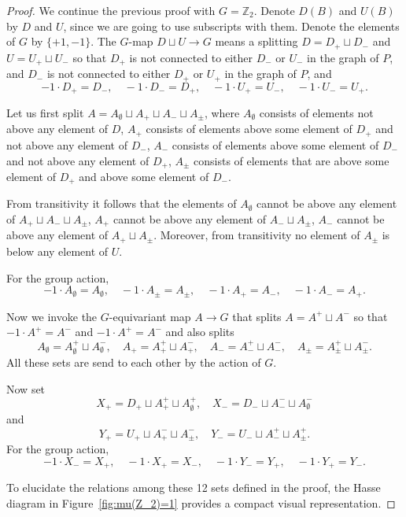\documentclass[10pt,a4paper]{amsart}
\begin{document}
\begin{proof}
We continue the previous proof with $G=\mathbb Z_2$. Denote $D(B)$ and $U(B)$ by $D$ and $U$, since we are going to use subscripts with them. Denote the elements of $G$ by $\{+1, -1\}$. The $G$-map $D\sqcup U\to G$ means a splitting $D=D_+\sqcup D_-$ and $U=U_+\sqcup U_-$ so that $D_+$ is not connected to either $D_-$ or $U_-$ in the graph of $P$, and $D_-$ is not connected to either $D_+$ or $U_+$ in the graph of $P$, and
    \[
    -1\cdot D_+=D_-, \quad -1\cdot D_-=D_+, \quad -1\cdot U_+=U_-, \quad -1\cdot U_-=U_+.
    \]
    
    Let us first split $A=A_\emptyset\sqcup A_+\sqcup A_-\sqcup A_\pm$, where $A_\emptyset$ consists of elements not above any element of $D$, $A_+$ consists of elements above some element of $D_+$ and not above any element of $D_-$, $A_-$ consists of elements above some element of $D_-$ and not above any element of $D_+$, $A_\pm$ consists of elements that are above some element of $D_+$ and above some element of $D_-$. 
    
    From transitivity it follows that the elements of $A_\emptyset$ cannot be above any element of $A_+\sqcup A_-\sqcup A_\pm$, $A_+$ cannot be above any element of $A_-\sqcup A_\pm$, $A_-$ cannot be above any element of $A_+\sqcup A_\pm$. Moreover, from transitivity no element of $A_\pm$ is below any element of $U$.   
    
    For the group action,
    \[
    -1\cdot A_\emptyset= A_\emptyset, \quad -1\cdot A_\pm= A_\pm, \quad -1\cdot A_+=A_-,\quad -1\cdot A_-=A_+.
    \]
    
    Now we invoke the $G$-equivariant map $A\to G$ that splits $A=A^+\sqcup A^-$ so that $-1\cdot A^+=A^-$ and $-1\cdot A^+=A^-$ and also splits
    \[
    A_\emptyset = A_\emptyset^+\sqcup A_\emptyset^-,\quad 
    A_+ = A_+^+\sqcup A_+^-,\quad A_- = A_-^+\sqcup A_-^-,\quad A_\pm = A_\pm^+\sqcup A_\pm^-.
    \]
    All these sets are send to each other by the action of $G$.
    
    Now set
    \[
    X_+ = D_+\sqcup A_+^+\sqcup A_\emptyset^+,\quad X_-=D_-\sqcup A_-^-\sqcup A_\emptyset^-
    \]
    and
    \[
    Y_+ = U_+\sqcup A_+^-\sqcup A_\pm^-,\quad Y_-=U_-\sqcup A_-^+\sqcup A_\pm^+.
    \]
    For the group action,
    \[
    -1\cdot X_-=X_+, \quad -1\cdot X_+=X_-,\quad -1\cdot Y_- = Y_+, \quad -1\cdot Y_+ = Y_-.
    \]

To elucidate the relations among these 12 sets defined in the proof, the Hasse diagram in Figure~\ref{fig:mu(Z_2)=1} provides a compact visual representation.


\end{proof}
\end{document}
